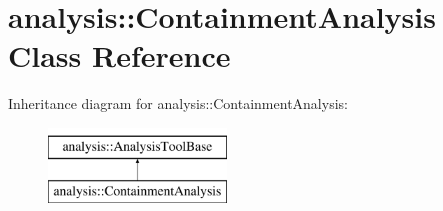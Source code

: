 \hypertarget{classanalysis_1_1ContainmentAnalysis}{\section{analysis\-:\-:Containment\-Analysis Class Reference}
\label{classanalysis_1_1ContainmentAnalysis}
}
Inheritance diagram for analysis\-:\-:Containment\-Analysis\-:\begin{figure}[H]
\begin{center}
\leavevmode
\includegraphics[height=2.000000cm]{classanalysis_1_1ContainmentAnalysis}
\end{center}
\end{figure}
